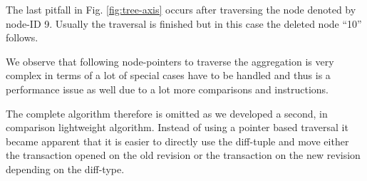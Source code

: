 
%

The last pitfall in Fig. \ref{fig:tree-axis} occurs after traversing the node denoted by node-ID 9. Usually the traversal is finished but in this case the deleted node ``10'' follows.

We observe that following node-pointers to traverse the aggregation is very complex in terms of a lot of special cases have to be handled and thus is a performance issue as well due to a lot more comparisons and instructions.

The complete algorithm therefore is omitted as we developed a second, in comparison light\-weight algorithm. Instead of using a pointer based traversal it became apparent that it is easier to directly use the diff-tuple and move either the transaction opened on the old revision or the transaction on the new revision depending on the diff-type.

